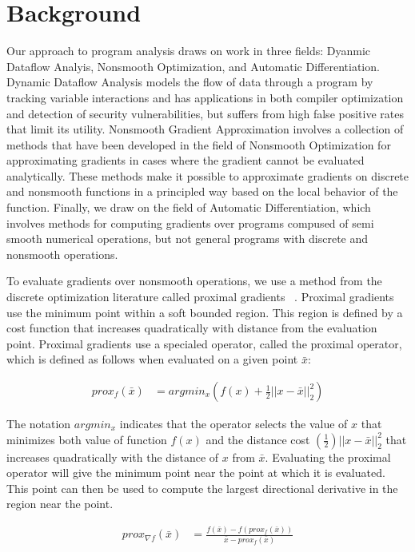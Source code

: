 \documentclass[conference]{IEEEtran}
\begin{document}
\section{Background}
Our approach to program analysis draws on work in three fields: Dyanmic Dataflow Analyis, Nonsmooth Optimization, and Automatic Differentiation. Dynamic Dataflow Analysis models the flow of data through a program by tracking variable interactions and has applications in both compiler optimization and detection of security vulnerabilities, but suffers from high false positive rates that limit its utility. Nonsmooth Gradient Approximation involves a collection of methods that have been developed in the field of Nonsmooth Optimization for approximating gradients in cases where the gradient cannot be evaluated analytically. These methods make it possible to approximate gradients on discrete and nonsmooth functions in a principled way based on the local behavior of the function. Finally, we draw on the field of Automatic Differentiation, which involves methods for computing gradients over programs compused of semi smooth numerical operations, but not general programs with discrete and nonsmooth operations.

To evaluate gradients over nonsmooth operations, we use a method from the discrete optimization literature called proximal gradients ~\cite{parikh2014proximal}. Proximal gradients use the minimum point within a soft bounded region. This region is defined by a cost function that increases quadratically with distance from the evaluation point. Proximal gradients use a specialed operator, called the proximal operator, which is defined as follows when evaluated on a given point $\bar{x}$:

\vspace{-10pt}\begin{align}
  prox_f\left(\bar{x}\right) &= argmin_x \left(f\left(x\right) + \tfrac{1}{2}|| x-\bar{x}||_2^2\right)
\end{align}

The notation $argmin_x$ indicates that the operator selects the value of $x$ that minimizes both value of function $f\left(x\right)$ and the distance cost $\left(\tfrac{1}{2}\right)|| x-\bar{x}||_2^2$ that increases quadratically with the distance of $x$ from $\bar{x}$. Evaluating the proximal operator will give the minimum point near the point at which it is evaluated. This point can then be used to compute the largest directional derivative in the region near the point. 

\vspace{-10pt}\begin{align}
  prox_{\nabla f}\left(\bar{x}\right) &= \frac{f\left(\bar{x}\right) - f\left(prox_f\left(\bar{x}\right)\right)}{\bar{x} - prox_f\left(\bar{x}\right)}
\end{align}
\end{document}
